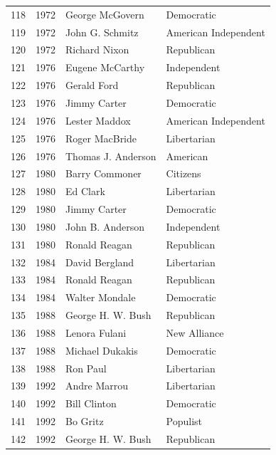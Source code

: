 \documentclass[
  letterpaper,
  DIV=11,
  numbers=noendperiod]{scrreprt}
\begin{document}
\begin{tabular}{lrll}
118 &  1972 &         George McGovern &             Democratic \\
119 &  1972 &         John G. Schmitz &   American Independent \\
120 &  1972 &           Richard Nixon &             Republican \\
121 &  1976 &         Eugene McCarthy &            Independent \\
122 &  1976 &             Gerald Ford &             Republican \\
123 &  1976 &            Jimmy Carter &             Democratic \\
124 &  1976 &           Lester Maddox &   American Independent \\
125 &  1976 &          Roger MacBride &            Libertarian \\
126 &  1976 &      Thomas J. Anderson &               American \\
127 &  1980 &          Barry Commoner &               Citizens \\
128 &  1980 &                Ed Clark &            Libertarian \\
129 &  1980 &            Jimmy Carter &             Democratic \\
130 &  1980 &        John B. Anderson &            Independent \\
131 &  1980 &           Ronald Reagan &             Republican \\
132 &  1984 &          David Bergland &            Libertarian \\
133 &  1984 &           Ronald Reagan &             Republican \\
134 &  1984 &          Walter Mondale &             Democratic \\
135 &  1988 &       George H. W. Bush &             Republican \\
136 &  1988 &           Lenora Fulani &           New Alliance \\
137 &  1988 &         Michael Dukakis &             Democratic \\
138 &  1988 &                Ron Paul &            Libertarian \\
139 &  1992 &            Andre Marrou &            Libertarian \\
140 &  1992 &            Bill Clinton &             Democratic \\
141 &  1992 &                Bo Gritz &               Populist \\
142 &  1992 &       George H. W. Bush &             Republican \\

\end{tabular}
\end{document}
